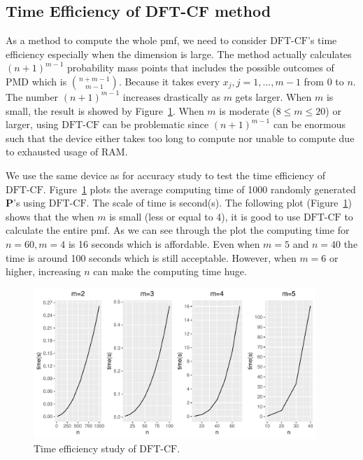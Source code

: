 \documentclass[12pt]{article}
\newcommand{\Pmat}{\mathbf{P}}
\newcommand{\PMD}{\textrm{PMD}}
\newcommand{\dft}{{\textrm{DFT-CF}}}
\begin{document}
\subsection{Time Efficiency of DFT-CF method}
As a method to compute the whole pmf, we need to consider $\dft$'s time efficiency especially when the dimension is large. The method actually calculates $(n+1)^{m-1}$ probability mass points that includes the possible outcomes of $\PMD$ which is $\binom{n+m-1}{m-1}$. Because it takes every $x_j,j=1,\dots,m-1$ from 0 to $n$. The number $(n+1)^{m-1}$ increases drastically as $m$ gets larger. When $m$ is small, the result is showed by Figure~\ref{fig:time.eff}. When $m$ is moderate ($8 \leq m \leq 20$) or larger, using $\dft$ can be problematic since $(n+1)^{m-1}$ can be enormous such that the device either takes too long to compute nor unable to compute due to exhausted usage of RAM.

We use the same device as for accuracy study to test the time efficiency of $\dft$. Figure~\ref{fig:time.eff} plots the average computing time of 1000 randomly generated $\Pmat$'s using $\dft$. The scale of time is second(s). The following plot (Figure~\ref{fig:time.eff}) shows that the when $m$ is small (less or equal to 4), it is good to use $\dft$ to calculate the entire pmf. As we can see through the plot the computing time for $n=60, m=4$ is 16 seconds which is affordable. Even when $m=5$ and $n=40$ the time is around 100 seconds which is still acceptable. However, when $m=6$ or higher, increasing $n$ can make the computing time huge.


\begin{figure}%
\begin{center}
	\includegraphics[width=0.95\textwidth]{figures/effi.pdf}
	\caption{Time efficiency study of $\dft$.}
	\label{fig:time.eff}
\end{center}
\end{figure}
\end{document}
